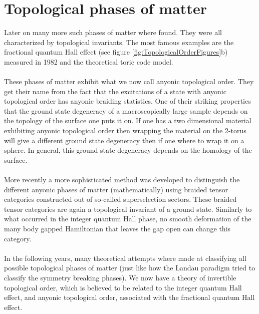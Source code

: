 \section{Topological phases of matter}
Later on many more such phases of matter where found. They were all characterized by topological invariants. The most famous examples are the fractional quantum Hall effect (see figure \ref{fig:TopologicalOrderFigures}b) measured in 1982 and the theoretical toric code model.
\\\\
These phases of matter exhibit what we now call anyonic topological order. They get their name from the fact that the excitations of a state with anyonic topological order has anyonic braiding statistics. One of their striking properties that the ground state degeneracy of a macroscopically large sample depends on the topology of the surface one puts it on. If one has a two dimensional material exhibiting anyonic topological order then wrapping the material on the 2-torus will give a different ground state degeneracy then if one where to wrap it on a sphere. In general, this ground state degeneracy depends on the homology of the surface.
\\\\
More recently a more sophisticated method was developed to distinguish the different anyonic phases of matter (mathematically) using braided tensor categories constructed out of so-called superselection sectors. These braided tensor categories are again a topological invariant of a ground state. Similarly to what occurred in the integer quantum Hall phase, no smooth deformation of the many body gapped Hamiltonian that leaves the gap open can change this category.
\\\\
In the following years, many theoretical attempts where made at classifying all possible topological phases of matter (just like how the Landau paradigm tried to classify the symmetry breaking phases). We now have a theory of invertible topological order, which is believed to be related to the integer quantum Hall effect, and anyonic topological order, associated with the fractional quantum Hall effect.
